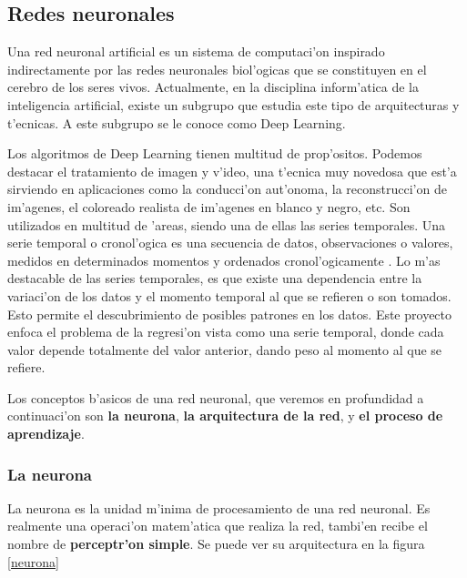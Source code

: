 \subsection{Redes neuronales}

Una red neuronal artificial es un sistema de computaci'on inspirado indirectamente por las redes neuronales biol'ogicas que se constituyen en el cerebro de los seres vivos. \cite{deep1}
Actualmente, en la disciplina inform'atica de la inteligencia artificial, existe un subgrupo que estudia este tipo de arquitecturas y t'ecnicas. A este subgrupo se le conoce como Deep Learning.

Los algoritmos de Deep Learning tienen multitud de prop'ositos. Podemos destacar el tratamiento de imagen y v'ideo, una t'ecnica muy novedosa que est'a sirviendo en aplicaciones como la conducci'on aut'onoma, la reconstrucci'on de im'agenes, el coloreado realista de im'agenes en blanco y negro, etc. 
Son utilizados en multitud de 'areas, siendo una de ellas las series temporales. Una serie temporal o cronol'ogica es una secuencia de datos, observaciones o valores, medidos en determinados momentos y ordenados cronol'ogicamente \cite{deep2}. Lo m'as destacable de las series temporales, es que existe una dependencia entre la variaci'on de los datos y el momento temporal al que se refieren o son tomados. Esto permite el descubrimiento de posibles patrones en los datos. 
Este proyecto enfoca el problema de la regresi'on vista como una serie temporal, donde cada valor depende totalmente del valor anterior, dando peso al momento al que se refiere.

Los conceptos b'asicos de una red neuronal, que veremos en profundidad a continuaci'on son \textbf{la neurona}, \textbf{la arquitectura de la red}, y \textbf{el proceso de aprendizaje}.

\clearpage

\subsubsection{La neurona}
La neurona es la unidad m'inima de procesamiento de una red neuronal. Es realmente una operaci'on matem'atica que realiza la red, tambi'en recibe el nombre de \textbf{perceptr'on simple}.
Se puede ver su arquitectura en la figura \ref{neurona}




